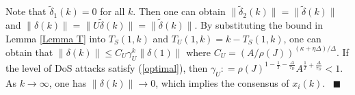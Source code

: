 \documentclass[letterpaper,journal,final,twocolumn]{IEEEtran}
\def\qedp{\hspace*{\fill}~{\tiny $\blacksquare$}}
\begin{document}
Note that $\tilde \delta_1 (k) = 0$ for all $k$. Then one can obtain $\|\tilde \delta_2 (k) \| = \|\tilde \delta(k)\|$ and $\|\delta(k) \| = \|   U \tilde \delta(k)\|  = \|\tilde \delta(k)\|$.
By substituting the bound in Lemma \ref{Lemma T} into $T_S(1, k)$ and $T_U(1,k )=k-T_S(1, k)$, one can obtain that 
$
\|\delta(k)\| \le  C_U  \gamma_U  ^k   \|\delta (1)\| 
$
where $C_U  = \left( A / \rho(J)  \right)^{(\kappa+\eta\Delta)/\Delta} $. 
If the level of DoS attacks satisfy (\ref{optimal}), then
$
\gamma _ U : = \rho(J) ^{1-\frac{1}{T}-\frac{\Delta}{\tau_D}  } A ^ { \frac{1}{T}+ \frac{\Delta}{\tau_D}   } < 1.
$
As $k \to \infty$, one has $\|\delta(k)  \| \to 0 $, which implies the consensus of $x_i(k)$.  
\qedp









\end{document}
